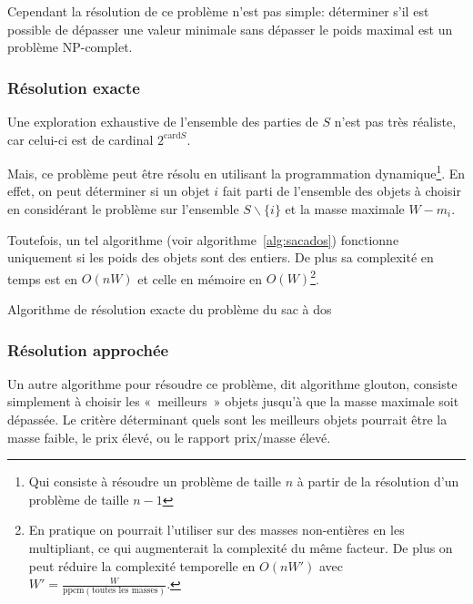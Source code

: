     Cependant la résolution de ce problème n'est pas simple: déterminer s'il
    est possible de dépasser une valeur minimale sans dépasser le poids maximal
    est un problème NP\nobreakdash-complet.

  \subsubsection{Résolution exacte}
    Une exploration exhaustive de l'ensemble des parties de $S$ n'est pas très
    réaliste, car celui-ci est de cardinal $2^{\mathrm{card} S}$.

    Mais, ce problème peut être résolu en utilisant la programmation
    dynamique\footnote{Qui consiste à résoudre un problème de taille $n$ à
    partir de la résolution d'un problème de taille $n-1$}. En effet, on peut
    déterminer si un objet $i$ fait parti de l'ensemble des objets à choisir en
    considérant le problème sur l'ensemble $S\backslash\{i\}$ et la masse
    maximale $W-m_i$.
    
    Toutefois, un tel algorithme (voir algorithme~\ref{alg:sacados}) fonctionne
    uniquement si les poids des objets
    sont des entiers. De plus sa complexité en temps est en $O(nW)$ et celle en
    mémoire en $O(W)$\footnote{En pratique on pourrait l'utiliser sur des
    masses non-entières en les multipliant, ce qui augmenterait la complexité
    du même facteur. De plus on peut réduire la complexité temporelle en
    $O(nW')$ avec $W' = \frac W {\mathrm{ppcm}(\text{toutes les masses})}$.}.

    \begin{algorithm}
      \caption{Algorithme de résolution exacte du problème du sac à dos}
      \label{alg:sacados}
    \end{algorithm}

  \subsubsection{Résolution approchée}
    Un autre algorithme pour résoudre ce problème, dit algorithme glouton,
    consiste simplement à choisir les «~meilleurs~» objets jusqu'à que la masse
    maximale soit dépassée. Le critère déterminant quels sont les meilleurs
    objets pourrait être la masse faible, le prix élevé, ou le rapport
    prix/masse élevé.

